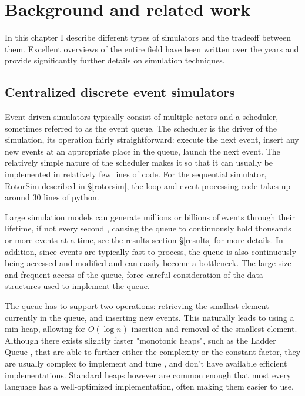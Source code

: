\chapter{Background and related work} \label{background}

In this chapter I describe different types of simulators and the tradeoff between them.
Excellent overviews of the entire field have been written over the years \cite{fujimoto_parallel_2001} \cite{fujimoto_computational_2017} and provide significantly further details on simulation techniques.

\section{Centralized discrete event simulators} \label{centralized-sim}

Event driven simulators typically consist of multiple actors and a scheduler, sometimes referred to as the event queue. %
The scheduler is the driver of the simulation, its operation fairly straightforward: execute the next event, insert any new events at an appropriate place in the queue, launch the next event.
The relatively simple nature of the scheduler makes it so that it can usually be implemented in relatively few lines of code.
For the sequential simulator, RotorSim\cite{brode-roger_nibriviarotorsim_2020} described in \S \ref{rotorsim}, the loop and event processing code takes up around 30 lines of python.

Large simulation models can generate millions or billions of events through their lifetime, if not every second \cite{fujimoto_parallel_2015}, causing the queue to continuously hold thousands or more events at a time, see the results section \S\ref{results} for more details.
In addition, since events are typically fast to process, the queue is also continuously being accessed and modified and can easily become a bottleneck.
The large size and frequent access of the queue, force careful consideration of the data structures used to implement the queue.

The queue has to support two operations: retrieving the smallest element currently in the queue, and inserting new events.
This naturally leads to using a min-heap, allowing for $O\left(\log n\right)$ insertion and removal of the smallest element.
Although there exists slightly faster "monotonic heaps", such as the Ladder Queue \cite{tang_ladder_2005}, that are able to further either the complexity or the constant factor, they are usually complex to implement and tune \cite{furfaro_adaptive_2018}, and don't have available efficient implementations.
Standard heaps however are common enough that most every language has a well-optimized implementation, often making them easier to use.

